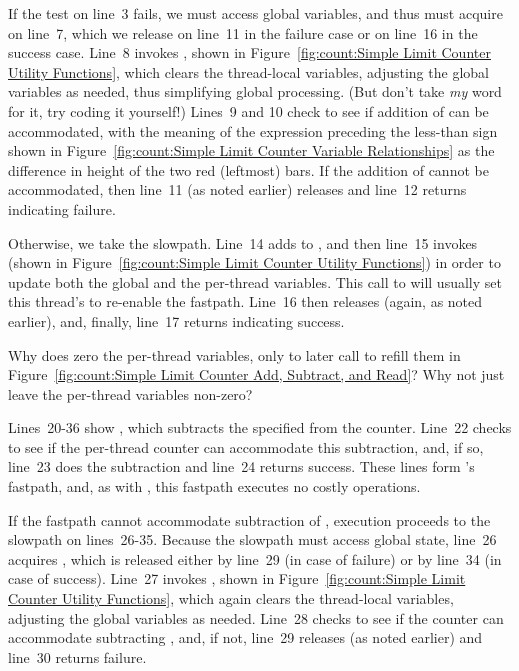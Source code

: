 If the test on line~3 fails, we must access global variables, and thus
must acquire  on line~7, which we release on line~11
in the failure case or on line~16 in the success case.
Line~8 invokes , shown in
Figure~\ref{fig:count:Simple Limit Counter Utility Functions},
which clears the thread-local variables, adjusting the global variables
as needed, thus simplifying global processing.
(But don't take \emph{my} word for it, try coding it yourself!)
Lines~9 and 10 check to see if addition of  can be accommodated,
with the meaning of the expression preceding the less-than sign shown in
Figure~\ref{fig:count:Simple Limit Counter Variable Relationships}
as the difference in height of the two red (leftmost) bars.
If the addition of  cannot be accommodated, then
line~11 (as noted earlier) releases  and line~12
returns indicating failure.

Otherwise, we take the slowpath.
Line~14 adds  to , and then
line~15 invokes  (shown in
Figure~\ref{fig:count:Simple Limit Counter Utility Functions})
in order to update both the global and the per-thread variables.
This call to 
will usually set this thread's  to re-enable the fastpath.
Line~16 then releases
 (again, as noted earlier), and, finally,
line~17 returns indicating success.

\QuickQuiz{}
	Why does  zero the per-thread variables,
	only to later call  to refill them in
	Figure~\ref{fig:count:Simple Limit Counter Add, Subtract, and Read}?
	Why not just leave the per-thread variables non-zero?
 \QuickQuizEnd

Lines~20-36 show , which subtracts the specified
 from the counter.
Line~22 checks to see if the per-thread counter can accommodate
this subtraction, and, if so, line~23 does the subtraction and
line~24 returns success.
These lines form 's fastpath, and, as with
, this fastpath executes no costly operations.

If the fastpath cannot accommodate subtraction of ,
execution proceeds to the slowpath on lines~26-35.
Because the slowpath must access global state, line~26
acquires , which is released either by line~29
(in case of failure) or by line~34 (in case of success).
Line~27 invokes , shown in
Figure~\ref{fig:count:Simple Limit Counter Utility Functions},
which again clears the thread-local variables, adjusting the global variables
as needed.
Line~28 checks to see if the counter can accommodate subtracting
, and, if not, line~29 releases 
(as noted earlier) and line~30 returns failure.

